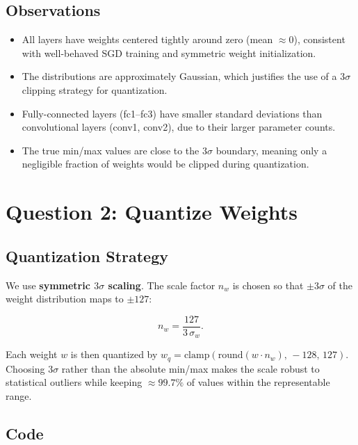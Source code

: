 \documentclass[11pt, letterpaper]{article}
\begin{document}
\subsection{Observations}
\begin{itemize}
  \item All layers have weights centered tightly around zero (mean $\approx0$),
        consistent with well-behaved SGD training and symmetric weight initialization.
  \item The distributions are approximately Gaussian, which justifies the use of a
        $3\sigma$ clipping strategy for quantization.
  \item Fully-connected layers (fc1--fc3) have smaller standard deviations than
        convolutional layers (conv1, conv2), due to their larger parameter counts.
  \item The true min/max values are close to the $3\sigma$ boundary, meaning only
        a negligible fraction of weights would be clipped during quantization.
\end{itemize}

\section{Question 2: Quantize Weights}

\subsection{Quantization Strategy}

We use \textbf{symmetric $3\sigma$ scaling}. The scale factor $n_w$ is
chosen so that $\pm3\sigma$ of the weight distribution maps to $\pm127$:

\begin{equation}
  n_w = \frac{127}{3\,\sigma_w}.
  \label{eq:weight_scale}
\end{equation}

Each weight $w$ is then quantized by
$w_q = \mathrm{clamp}(\mathrm{round}(w \cdot n_w),\, -128,\, 127).$
Choosing $3\sigma$ rather than the absolute min/max makes the scale robust
to statistical outliers while keeping ${\approx}99.7\%$ of values within
the representable range.

\subsection{Code}
\end{document}
